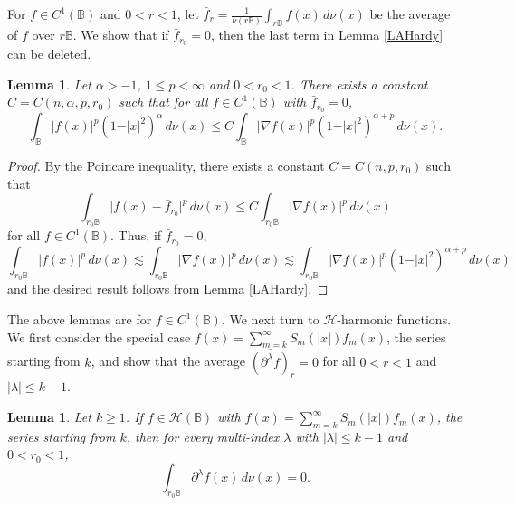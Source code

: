 \documentclass{amsart}
\newtheorem{lemma}[theorem]{Lemma}
\theoremstyle{definition}
\theoremstyle{remark}
\begin{document}
For $f\in C^1(\mathbb B)$ and $0<r<1$, let
$\bar{f}_r=\frac{1}{\nu(r\mathbb B)}\int_{r\mathbb B}f(x)\,d\nu(x)$
be the average of $f$ over $r\mathbb B$.
We show that if $\bar{f}_{r_0}=0$, then the last term in
Lemma \ref{LAHardy} can be deleted.

\begin{lemma}\label{Lflessnabla}
Let $\alpha>-1$, $1\le p<\infty$ and $0<r_0<1$.
There exists a constant $C=C(n,\alpha,p,r_0)$ such that for all
$f\in C^1(\mathbb B)$ with $\bar{f}_{r_0}=0$,
\begin{equation*}
\int_{\mathbb B} \vert f(x)\vert^p(1-\vert x\vert^2)^\alpha\, d\nu(x)
\le C
\int_{\mathbb B} \vert \nabla f(x)\vert^p(1-\vert x\vert^2)^{\alpha+p}\, d\nu(x).
\end{equation*}
\end{lemma}

\begin{proof}
By the Poincare inequality, there exists a constant $C=C(n,p,r_0)$ such that
\begin{equation*}
\int_{r_0\mathbb B}\vert f(x)-\bar{f}_{r_0}\vert^p\,d\nu(x)
\le C \int_{r_0\mathbb B}\vert\nabla f(x)\vert^p\,d\nu(x)
\end{equation*}
for all $f\in C^1(\mathbb B)$.
Thus, if $\bar{f}_{r_0}=0$,
\begin{equation*}
\int_{r_0\mathbb B} \vert f(x)\vert^p\, d\nu(x)
\lesssim \int_{r_0\mathbb B} \vert \nabla f(x)\vert^p\, d\nu(x)
\lesssim \int_{r_0\mathbb B} \vert \nabla f(x)\vert^p(1-\vert x\vert^2)^{\alpha+p}\, d\nu(x)
\end{equation*}
and the desired result follows from Lemma \ref{LAHardy}.
\end{proof}

The above lemmas are for $f\in C^1(\mathbb B)$.
We next turn to $\mathcal H$-harmonic functions.
We first consider the special case
$f(x)=\sum_{m=k}^\infty S_m(\vert x\vert)f_m(x)$, the series starting from $k$,
and show that the average $\overline{(\partial^\lambda f)}_r=0$ for all $0<r<1$ and
$\vert\lambda\vert\le k-1$.
\begin{lemma}\label{Laverage0}
Let $k\ge 1$.
If $f\in\mathcal H(\mathbb B)$ with
$f(x)=\sum_{m=k}^\infty S_m(\vert x\vert)f_m(x)$, the series starting from $k$,
then for every multi-index $\lambda$ with $\vert\lambda\vert\le k-1$
and $0<r_0<1$,
\begin{equation*}
  \int_{r_0\mathbb B}\partial^\lambda f(x)\, d\nu(x)=0.
\end{equation*}
\end{lemma}
\end{document}
